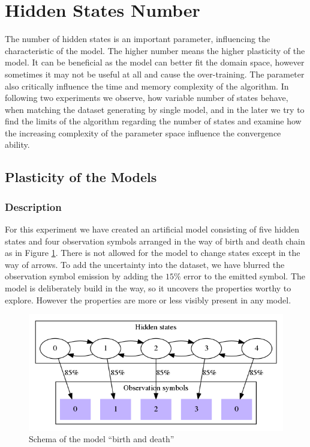\documentclass[thesis=M,english]{FITthesis}[2012/10/20]
\begin{document}
\section{Hidden States Number}\label{sec:hsn}

The number of hidden states is an important parameter, influencing the characteristic of the model. The higher number means the higher plasticity of the model. It can be beneficial as the model can better fit the domain space, however sometimes it may not be useful at all and cause the over-training. The parameter also critically influence the time and memory complexity of the algorithm. In following two experiments we observe, how variable number of states behave, when matching the dataset generating by single model, and in the later we try to find the limits of the algorithm regarding the number of states and examine how the increasing complexity of the parameter space influence the convergence ability.    

\subsection{Plasticity of the Models}\label{sec:plast}

\subsubsection*{ Description }
For this experiment we have created an artificial model consisting of five hidden states and four observation symbols arranged in the way of birth and death chain as in Figure \ref{fig:db}. There is not allowed for the model to change states except in the way of arrows. To add the uncertainty into the dataset, we have blurred the observation symbol emission by adding the $15\%$ error to the emitted symbol. The model is deliberately build in the way, so it uncovers the properties worthy to explore. However the properties are more or less visibly present in any model. 


\begin{figure}
\centering
\includegraphics[width=1\linewidth]{img/ex5/hs.png}
\caption{Schema of the model ``birth and death'' }
\label{fig:db}
\end{figure}
 
\end{document}
